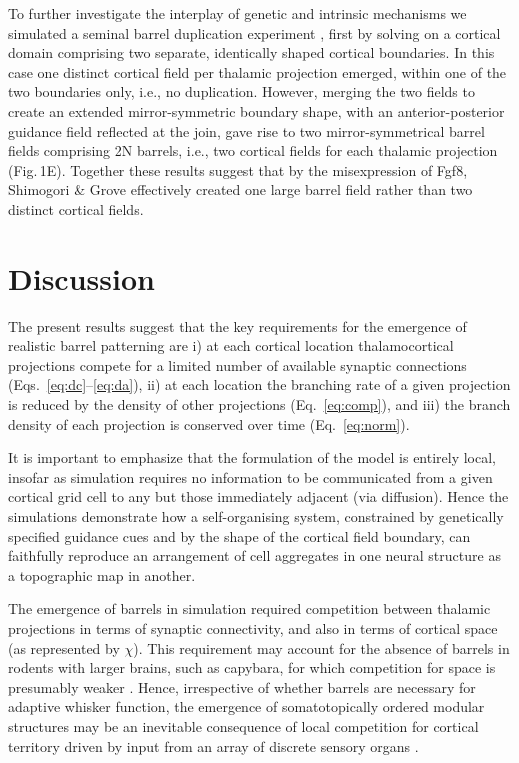 \documentclass[9pt,twocolumn,twoside,lineno]{pnas-new}
\begin{document}
To further investigate the interplay of genetic and intrinsic mechanisms we simulated a seminal barrel duplication experiment \cite{shimogori_fibroblast_2005},  first by solving on a cortical domain comprising two separate, identically shaped cortical boundaries. In this case one distinct cortical field per thalamic projection emerged, within one of the two boundaries only, i.e., no duplication. However, merging the two fields to create an extended mirror-symmetric boundary shape, with an anterior-posterior guidance field reflected at the join, gave rise to two mirror-symmetrical barrel fields comprising 2N barrels, i.e., two cortical fields for each thalamic projection (Fig.\,1E). Together these results suggest that by the misexpression of Fgf8, Shimogori \& Grove \citep{shimogori_fibroblast_2005} effectively created one large barrel field rather than two distinct cortical fields.

\section*{Discussion}

The present results suggest that the key requirements for the emergence of realistic barrel patterning are i) at each cortical location thalamocortical projections compete for a limited number of available synaptic connections (Eqs.~\ref{eq:dc}--\ref{eq:da}), ii) at each location the branching rate of a given projection is reduced by the density of other projections (Eq.~\ref{eq:comp}), and iii) the branch density of each projection is conserved over time (Eq.~\ref{eq:norm}).

It is important to emphasize that the formulation of the model is entirely local, insofar as simulation requires no information to be communicated from a given cortical grid cell to any but those immediately adjacent (via diffusion). Hence the simulations demonstrate how a self-organising system, constrained by genetically specified guidance cues and by the shape of the cortical field boundary, can faithfully reproduce an arrangement of cell aggregates in one neural structure as a topographic map in another.

The emergence of barrels in simulation required competition between thalamic projections in terms of synaptic connectivity, and also in terms of cortical space (as represented by $\chi$). This requirement may account for the absence of barrels in rodents with larger brains, such as capybara, for which competition for space is presumably weaker \citep{Woolsey1975}. Hence, irrespective of whether barrels are necessary for adaptive whisker function, the emergence of somatotopically ordered modular structures may be an inevitable consequence of local competition for cortical territory driven by input from an array of discrete sensory organs \citep{purves_iterated_1992}.
\end{document}
